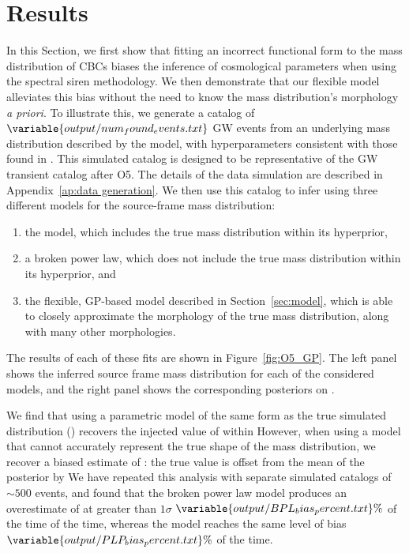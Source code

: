 \documentclass[]{aastex631}
\begin{document}
\section{Results}
\label{sec:results}
In this Section, we first show that fitting an incorrect functional form to the mass distribution of \acp{CBC} biases the inference of cosmological parameters when using the spectral siren methodology.
We then demonstrate that our flexible model alleviates this bias without the need to know the mass distribution's morphology \emph{a priori}.
To illustrate this, we generate a catalog of $\variable{output/num_found_events.txt}$ \ac{GW} events from an underlying mass distribution described by the \plp{} model, with hyperparameters consistent with those found in \citet{o3b_pop}.
This simulated catalog is designed to be representative of the \ac{GW}  transient catalog after \ac{O5}.
The details of the data simulation are described in Appendix~\ref{ap:data generation}.
We then use this catalog to infer  using three different models for the source-frame mass distribution:
\begin{enumerate}
    \item the \plp{} model, which includes the true mass distribution within its hyperprior,
    \item a broken power law, which does not include the true mass distribution within its hyperprior, and 
    \item the flexible, \ac{GP}-based model described in Section~\ref{sec:model}, which is able to closely approximate the morphology of the true mass distribution, along with many other morphologies.
\end{enumerate}
The results of each of these fits are shown in Figure~\ref{fig:O5_GP}. 
The left panel shows the inferred source frame mass distribution for each of the considered models, and the right panel shows the corresponding posteriors on \Ho{}.

We find that using a parametric model of the same form as the true simulated distribution (\plp) recovers the injected value of \Ho{} within %
However, when using a model that cannot accurately represent the true shape of the mass distribution, we recover a biased estimate of \Ho: the true value is offset from the mean of the posterior by %
We have repeated this analysis with  separate simulated catalogs of $\sim500$ events, and found that the broken power law model produces an overestimate of \Ho{} at greater than $1\sigma$ $\variable{output/BPL_bias_percent.txt}\%$ of the time of the time, whereas %
the \plp{} model reaches the same level of bias $\variable{output/PLP_bias_percent.txt}\%$ of the time.
\end{document}
